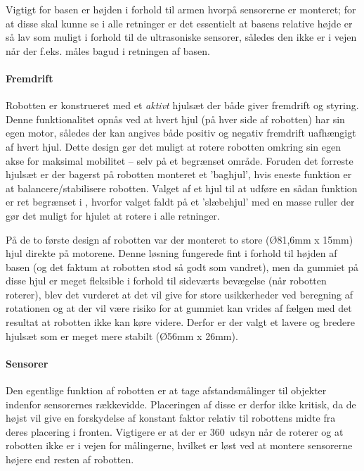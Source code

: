 Vigtigt for basen er højden i forhold til armen hvorpå sensorerne er monteret; for at disse skal kunne se i alle retninger er det essentielt at basens relative højde er så lav som muligt i forhold til de ultrasoniske sensorer, således den ikke er i vejen når der f.eks. måles bagud i retningen af basen. 

\paragraph{Fremdrift}
Robotten er konstrueret med et \textit{aktivt} hjulsæt der både giver fremdrift og styring.
Denne funktionalitet opnås ved at hvert hjul (på hver side af robotten) har sin egen motor, således der kan angives både positiv og negativ fremdrift uafhængigt af hvert hjul.
Dette design gør det muligt at rotere robotten omkring sin egen akse for maksimal mobilitet -- selv på et begrænset område.
Foruden det forreste hjulsæt er der bagerst på robotten monteret et 'baghjul', hvis eneste funktion er at balancere/stabilisere robotten.
Valget af et hjul til at udføre en sådan funktion er ret begrænset i \lego, hvorfor valget faldt på et 'slæbehjul' med en masse ruller der gør det muligt for hjulet at rotere i alle retninger.

På de to første design af robotten var der monteret to store (Ø81,6mm x 15mm) hjul direkte på motorene.
Denne løsning fungerede fint i forhold til højden af basen (og det faktum at robotten stod så godt som vandret), men da gummiet på disse hjul er meget fleksible i forhold til sideværts bevægelse (når robotten roterer), blev det vurderet at det vil give for store usikkerheder ved beregning af rotationen og at der vil være risiko for at gummiet kan vrides af fælgen med det resultat at robotten ikke kan køre videre.
Derfor er der valgt et lavere og bredere hjulsæt som er meget mere stabilt (Ø56mm x 26mm).

\paragraph{Sensorer}

Den egentlige funktion af robotten er at tage afstandsmålinger til objekter indenfor sensorernes rækkevidde.
Placeringen af disse er derfor ikke kritisk, da de højst vil give en forskydelse af konstant faktor relativ til robottens midte fra deres placering i fronten.
Vigtigere er at der er 360\degree~udsyn når de roterer og at robotten ikke er i vejen for målingerne, hvilket er løst ved at montere sensorerne højere end resten af robotten. 



